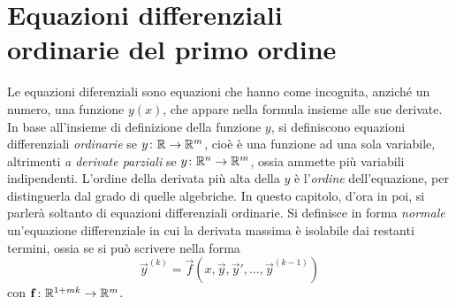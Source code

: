 \chapter[Equazioni differenziali ordinarie del primo ordine]{Equazioni differenziali\\ordinarie del primo ordine}
Le equazioni diferenziali sono equazioni che hanno come incognita, anziché un numero, una funzione $y(x)$, che appare nella formula insieme alle sue derivate. In base all'insieme di definizione della funzione $y$, si definiscono equazioni differenziali \emph{ordinarie} se $y\colon\mathbb{R}\to\mathbb{R}^m$, cioè è una funzione ad una sola variabile, altrimenti \emph{a derivate parziali} se $y\colon\mathbb{R}^n\to\mathbb{R}^m$, ossia ammette più variabili indipendenti. L'ordine della derivata più alta della $y$ è l'\emph{ordine} dell'equazione, per distinguerla dal grado di quelle algebriche.
In questo capitolo, d'ora in poi, si parlerà soltanto di equazioni differenziali ordinarie.
Si definisce in forma \emph{normale} un'equazione differenziale in cui la derivata massima è isolabile dai restanti termini, ossia se si può scrivere nella forma
\begin{equation}
\vec y^{(k)}=\vec f(x,\vec y,\vec y',\dots,\vec y^{(k-1)})
\end{equation}
con $\mathbf{f}\colon\mathbb{R}^{1+mk}\to\mathbb{R}^m$.
